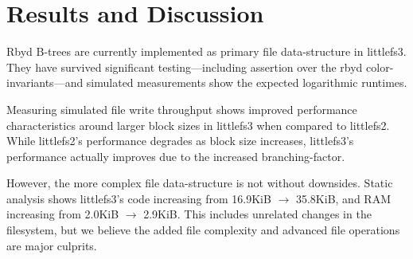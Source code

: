 \documentclass[letterpaper,twocolumn,10pt]{article}
\def\lfsiii+{avianfs}
\def\lfsiii+{littlefs3}
\def\lfsii+{littlefs2}
\begin{document}

%
%

% 

\section{Results and Discussion}
\label{sec:results}
\label{sec:discussion}

Rbyd B-trees are currently implemented as primary file data-structure in
\lfsiii+. They have survived significant testing---including assertion
over the rbyd color-invariants---and simulated measurements show the
expected logarithmic runtimes.

Measuring simulated file write throughput shows improved performance
characteristics around larger block sizes in \lfsiii+ when compared to
\lfsii+.
While \lfsii+'s performance degrades as block size increases, \lfsiii+'s
performance actually improves due to the increased branching-factor.

However, the more complex file data-structure is not without downsides.
Static analysis shows \lfsiii+'s code increasing from
16.9KiB {$\rightarrow$} 35.8KiB, and RAM increasing from
2.0KiB {$\rightarrow$} 2.9KiB.
This includes unrelated changes in the filesystem, but we believe the
added file complexity and advanced file operations are major culprits.
\end{document}

